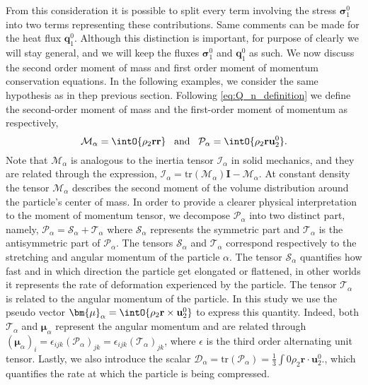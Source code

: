 From this consideration it is possible to split every term involving the stress $\bm{\sigma}_1^0$ into two terms representing these contributions. 
Same comments can be made for the heat flux $\textbf{q}_1^0$. 
Although this distinction is important, for purpose of clearly we will stay general, and we will keep the fluxes $\bm{\sigma}_1^0$ and $\textbf{q}_1^0$ as such. 
We now discuss the second order moment of mass and first order moment of momentum conservation equations. 
In the following examples, we consider the same hypothesis as in thep previous section. 
Following \ref{eq:Q_n_definition} we define the second-order moment of mass and the first-order moment of momentum as respectively,
\begin{equation}
    \mathcal{M}_\alpha 
    = \intO{ \rho_2 \textbf{r} \textbf{r} }
    \;\;\;\text{and}\;\;\;
    \mathcal{P}_\alpha 
    = \intO{ \rho_2 \textbf{r} \textbf{u}_2^0 }.
    \label{eq:first_moment_of_momentum_def}
\end{equation}
Note that $\mathcal{M}_\alpha$ is analogous to the inertia tensor $\mathcal{I}_\alpha$ in solid mechanics, and they are related through the expression, $\mathcal{I}_\alpha = \text{tr}(\mathcal{M}_\alpha)\textbf{I} - \mathcal{M}_\alpha$.
At constant density the tensor $\mathcal{M}_\alpha$ describes the second moment of the volume distribution around the particle's center of mass.
In order to provide a clearer physical interpretation to the moment of momentum tensor, we decompose $\mathcal{P}_\alpha$ into two distinct part, namely,
$\mathcal{P}_\alpha = \mathcal{S}_\alpha+\mathcal{T}_\alpha$ where $\mathcal{S}_\alpha$ represents the symmetric part and $\mathcal{T}_\alpha$ is the antisymmetric part of $\mathcal{P}_\alpha$.
The tensors $\mathcal{S}_\alpha$ and $\mathcal{T}_\alpha$ correspond respectively to the stretching and angular momentum of the particle $\alpha$. 
The tensor $\mathcal{S}_\alpha$ quantifies how fast and in which direction the particle get elongated or flattened, in other worlds it represents the rate of deformation experienced by the particle.
The tensor $\mathcal{T}_\alpha$ is related to the angular momentum of the particle. 
In this study we use the pseudo vector $\bm{\mu}_\alpha = \intO{ \rho_2 \textbf{r} \times \textbf{u}_2^0 }$ to express this quantity. 
Indeed, both  $\mathcal{T}_\alpha$ and $\bm{\mu}_\alpha$ represent the angular momentum and are related through $(\bm{\mu}_\alpha)_i = \epsilon_{ijk} (\mathcal{P}_\alpha)_{jk}= \epsilon_{ijk} (\mathcal{T}_\alpha)_{jk}$, where $\epsilon$ is the third order alternating unit tensor. 
Lastly, we also introduce the scalar $\mathcal{D}_\alpha = \text{tr}(\mathcal{P}_\alpha) = \frac{1}{3}\int0{ \rho_2 \textbf{r} \cdot \textbf{u}_2^0 }.$, which quantifies the rate at which the particle is being compressed.

